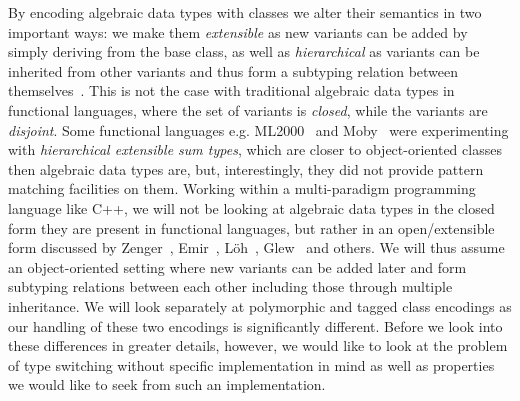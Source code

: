 By encoding algebraic data types with classes we alter their semantics in two 
important ways: we make them \emph{extensible} as new variants can be added by 
simply deriving from the base class, as well as \emph{hierarchical} as variants 
can be inherited from other variants and thus form a subtyping relation between 
themselves~\cite{Glew99}. This is not the case with traditional algebraic data 
types in functional languages, where the set of variants is \emph{closed}, while 
the variants are \emph{disjoint}. Some functional languages e.g. 
ML2000~\cite{ML2000} and Moby~\cite{Moby} were experimenting with 
\emph{hierarchical extensible sum types}, which are closer to object-oriented 
classes then algebraic data types are, but, interestingly, they did not provide 
pattern matching facilities on them. Working within a multi-paradigm  
programming language like C++, we will not be looking at algebraic data types in
the closed form they are present in functional languages, but rather in an 
open/extensible form discussed by Zenger~\cite{Zenger:2001}, Emir~\cite{EmirThesis}, 
L\"oh~\cite{LohHinze2006}, Glew~\cite{Glew99} and others. We will thus 
assume an object-oriented setting where new variants can be added later and form
subtyping relations between each other including those through multiple 
inheritance. We will look separately at polymorphic and tagged class encodings 
as our handling of these two encodings is significantly different. Before we 
look into these differences in greater details, however, we would like to look 
at the problem of type switching without specific implementation in mind as well 
as properties we would like to seek from such an implementation.







